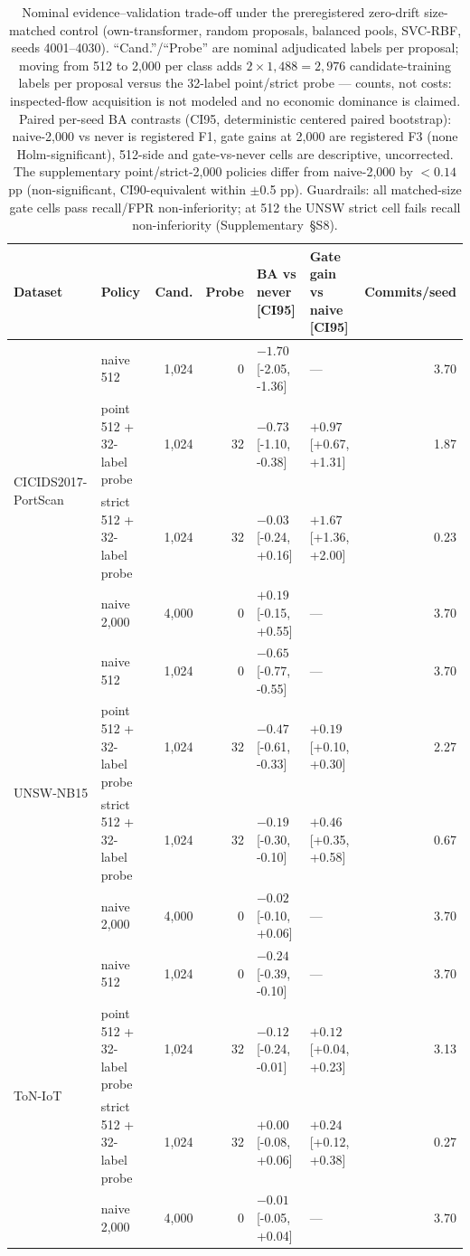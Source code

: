 \begin{table}[t]
\centering
\caption{Nominal evidence--validation trade-off under the preregistered zero-drift size-matched control (own-transformer, random proposals, balanced pools, SVC-RBF, seeds 4001--4030). ``Cand.''/``Probe'' are nominal adjudicated labels per proposal; moving from 512 to 2{,}000 per class adds $2\times1{,}488 = 2{,}976$ candidate-training labels per proposal versus the 32-label point/strict probe --- counts, not costs: inspected-flow acquisition is not modeled and no economic dominance is claimed. Paired per-seed BA contrasts (CI95, deterministic centered paired bootstrap): naive-2{,}000 vs never is registered F1, gate gains at 2{,}000 are registered F3 (none Holm-significant), 512-side and gate-vs-never cells are descriptive, uncorrected. The supplementary point/strict-2{,}000 policies differ from naive-2{,}000 by $<0.14$ pp (non-significant, CI90-equivalent within $\pm$0.5 pp). Guardrails: all matched-size gate cells pass recall/FPR non-inferiority; at 512 the UNSW strict cell fails recall non-inferiority (Supplementary~\S S8).}
\label{tab:evidence_validation_tradeoff}
\footnotesize
\setlength{\tabcolsep}{3.5pt}
\begin{tabular}{l l r r l l r}
\toprule
Dataset & Policy & Cand. & Probe & BA vs never [CI95] & Gate gain vs naive [CI95] & Commits/seed \\
\midrule
\multirow{4}{*}{CICIDS2017-PortScan} & naive 512 & 1,024 & 0 & $-1.70$ [-2.05, -1.36] & --- & 3.70 \\
 & point 512 + 32-label probe & 1,024 & 32 & $-0.73$ [-1.10, -0.38] & $+0.97$ [+0.67, +1.31] & 1.87 \\
 & strict 512 + 32-label probe & 1,024 & 32 & $-0.03$ [-0.24, +0.16] & $+1.67$ [+1.36, +2.00] & 0.23 \\
 & naive 2{,}000 & 4,000 & 0 & $+0.19$ [-0.15, +0.55] & --- & 3.70 \\
\midrule
\multirow{4}{*}{UNSW-NB15} & naive 512 & 1,024 & 0 & $-0.65$ [-0.77, -0.55] & --- & 3.70 \\
 & point 512 + 32-label probe & 1,024 & 32 & $-0.47$ [-0.61, -0.33] & $+0.19$ [+0.10, +0.30] & 2.27 \\
 & strict 512 + 32-label probe & 1,024 & 32 & $-0.19$ [-0.30, -0.10] & $+0.46$ [+0.35, +0.58] & 0.67 \\
 & naive 2{,}000 & 4,000 & 0 & $-0.02$ [-0.10, +0.06] & --- & 3.70 \\
\midrule
\multirow{4}{*}{ToN-IoT} & naive 512 & 1,024 & 0 & $-0.24$ [-0.39, -0.10] & --- & 3.70 \\
 & point 512 + 32-label probe & 1,024 & 32 & $-0.12$ [-0.24, -0.01] & $+0.12$ [+0.04, +0.23] & 3.13 \\
 & strict 512 + 32-label probe & 1,024 & 32 & $+0.00$ [-0.08, +0.06] & $+0.24$ [+0.12, +0.38] & 0.27 \\
 & naive 2{,}000 & 4,000 & 0 & $-0.01$ [-0.05, +0.04] & --- & 3.70 \\
\bottomrule
\end{tabular}
\end{table}
